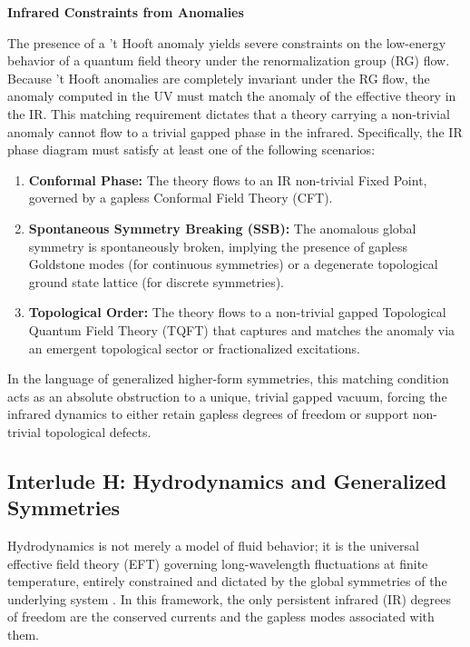 \documentclass[aps,preprint,nofootinbib,preprintnumbers,eqsecnum,superscriptaddress]{revtex4}
\numberwithin{equation}{section}
\begin{document}
\begin{tcolorbox}
{\bf Infrared Constraints from Anomalies}

The presence of a 't Hooft anomaly yields severe constraints on the low-energy behavior of a quantum field theory under the renormalization group (RG) flow. Because 't Hooft anomalies are completely invariant under the RG flow, the anomaly computed in the UV must match the anomaly of the effective theory in the IR. This matching requirement dictates that a theory carrying a non-trivial anomaly cannot flow to a trivial gapped phase in the infrared. Specifically, the IR phase diagram must satisfy at least one of the following scenarios:
\begin{enumerate}[\itshape i)]
    \item \textbf{Conformal Phase:} The theory flows to an IR non-trivial Fixed Point, governed by a gapless Conformal Field Theory (CFT).
    \item \textbf{Spontaneous Symmetry Breaking (SSB):} The anomalous global symmetry is spontaneously broken, implying the presence of gapless Goldstone modes (for continuous symmetries) or a degenerate topological ground state lattice (for discrete symmetries).
    \item \textbf{Topological Order:} The theory flows to a non-trivial gapped Topological Quantum Field Theory (TQFT) that captures and matches the anomaly via an emergent topological sector or fractionalized excitations.
\end{enumerate}
In the language of generalized higher-form symmetries, this matching condition acts as an absolute obstruction to a unique, trivial gapped vacuum, forcing the infrared dynamics to either retain gapless degrees of freedom or support non-trivial topological defects.
\end{tcolorbox}

\subsection{Interlude H: Hydrodynamics and Generalized Symmetries}
\label{sec:hydro}

Hydrodynamics is not merely a model of fluid behavior; it is the universal effective field theory (EFT) governing long-wavelength fluctuations at finite temperature, entirely constrained and dictated by the global symmetries of the underlying system \cite{McGreevy_2023, iqbal2025jenalecturesgeneralizedglobal}. In this framework, the only persistent infrared (IR) degrees of freedom are the conserved currents and the gapless modes associated with them.
\end{document}
